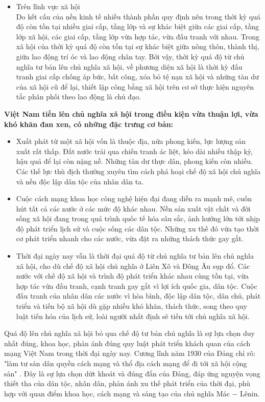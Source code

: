 \begin{itemize}
\item Trên lĩnh vực xã hội\\
Do kết cấu của nền kinh tế nhiều thành phần quy định nên trong thời kỳ quá độ còn tồn tại nhiều giai cấp, tầng lớp và sự khác biệt giữa các giai cấp, tầng lớp xã hội, các giai cấp, tầng lớp vừa hợp tác, vừa đấu tranh với nhau. Trong xã hội của thời kỳ quá độ còn tồn tại sự khác biệt giữa nông thôn, thành thị, giữa lao động trí óc và lao động chân tay. Bởi vậy, thời kỳ quá độ từ chủ nghĩa tư bản lên chủ nghĩa xã hội, về phương diện xã hội là thời kỳ đấu tranh giai cấp chống áp bức, bất công, xóa bỏ tệ nạn xã hội và những tàn dư của xã hội cũ để lại, thiết lập công bằng xã hội trên cơ sở thực hiện nguyên tắc phân phối theo lao động là chủ đạo.
\end{itemize}
\textbf{Việt Nam tiến lên chủ nghĩa xã hội trong điều kiện vừa thuận lợi, vừa khó khăn đan xen, có những đặc trưng cơ bản:}
\begin{itemize}
\item Xuất phát từ một xã hội vốn là thuộc địa, nửa phong kiến, lực lượng sản xuất rất thấp. Đất nước trải qua chiến tranh ác liệt, kéo dài nhiều thập kỷ, hậu quả để lại còn nặng nề. Những tàn dư thực dân, phong kiến còn nhiều. Các thế lực thù địch thường xuyên tìm cách phá hoại chế độ xã hội chủ nghĩa và nền độc lập dân tộc của nhân dân ta.
\item Cuộc cách mạng khoa học công nghệ hiện đại đang diễn ra mạnh mẽ, cuốn hút tất cả các nước ở các mức độ khác nhau. Nền sản xuất vật chất và đời sống xã hội đang trong quá trình quốc tế hóa sâu sắc, ảnh hưởng lớn tới nhịp độ phát triển lịch sử và cuộc sống các dân tộc. Những xu thế đó vừa tạo thời cơ phát triển nhanh cho các nước, vừa đặt ra những thách thức gay gắt.
\item Thời đại ngày nay vẫn là thời đại quá độ từ chủ nghĩa tư bản lên chủ nghĩa xã hội, cho dù chế độ xã hội chủ nghĩa ở Liên Xô và Đông Âu sụp đổ. Các nước với chế độ xã hội và trình độ phát triển khác nhau cùng tồn tại, vừa hợp tác vừa đấu tranh, cạnh tranh gay gắt vì lợi ích quốc gia, dân tộc. Cuộc đấu tranh của nhân dân các nước vì hòa bình, độc lập dân tộc, dân chủ, phát triển và tiến bộ xã hội dù gặp nhiều khó khăn, thách thức, song theo quy luật tiến hóa của lịch sử, loài người nhất định sẽ tiến tới chủ nghĩa xã hội.
\end{itemize}
Quá độ lên chủ nghĩa xã hội bỏ qua chế độ tư bản chủ nghĩa là sự lựa chọn duy nhất đúng, khoa học, phản ánh đúng quy luật phát triển khách quan của cách mạng Việt Nam trong thời đại ngày nay. Cương lĩnh năm 1930 của Đảng chỉ rõ: "làm tư sản dân quyền cách mạng và thổ địa cách mạng để đi tới xã hội cộng sản" \supercite{vkdtt2}. Đây là sự lựa chọn dứt khoát và đúng đắn của Đảng, đáp ứng nguyện vọng thiết tha của dân tộc, nhân dân, phản ánh xu thế phát triển của thời đại, phù hợp với quan điểm khoa học, cách mạng và sáng tạo của chủ nghĩa Mác $-$ Lênin.

